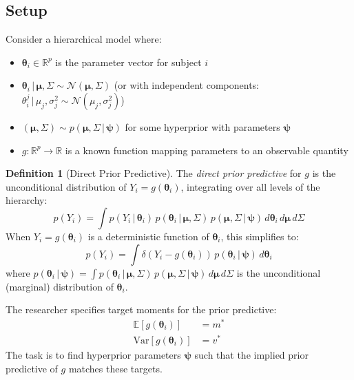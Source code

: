 \documentclass[11pt,a4paper]{article}
\theoremstyle{definition}
\newtheorem{definition}[theorem]{Definition}
\newcommand{\E}{\mathbb{E}}
\newcommand{\Var}{\mathrm{Var}}
\newcommand{\Normal}{\mathcal{N}}
\newcommand{\given}{\,|\,}
\newcommand{\bpsi}{\boldsymbol{\psi}}
\newcommand{\btheta}{\boldsymbol{\theta}}
\newcommand{\bmu}{\boldsymbol{\mu}}
\begin{document}
\subsection{Setup}

Consider a hierarchical model where:
\begin{itemize}
    \item $\btheta_i \in \mathbb{R}^p$ is the parameter vector for subject $i$
    \item $\btheta_i \given \bmu, \Sigma \sim \Normal(\bmu, \Sigma)$ (or with
        independent components: $\theta_i^j \given \mu_j, \sigma_j^2 \sim
        \Normal(\mu_j, \sigma_j^2)$)
    \item $(\bmu, \Sigma) \sim p(\bmu, \Sigma \given \bpsi)$ for some
        hyperprior with parameters $\bpsi$
    \item $g: \mathbb{R}^p \to \mathbb{R}$ is a known function mapping
        parameters to an observable quantity
\end{itemize}

\begin{definition}[Direct Prior Predictive]
The \emph{direct prior predictive} for $g$ is the unconditional distribution of
$Y_i = g(\btheta_i)$, integrating over all levels of the hierarchy:
\begin{equation}
    \label{eq:prior_predictive}
    p(Y_i) = \int p(Y_i \given \btheta_i) \, p(\btheta_i \given \bmu, \Sigma)
    \, p(\bmu, \Sigma \given \bpsi) \, d\btheta_i \, d\bmu \, d\Sigma
\end{equation}
When $Y_i = g(\btheta_i)$ is a deterministic function of $\btheta_i$, this
simplifies to:
\begin{equation}
    p(Y_i) = \int \delta(Y_i - g(\btheta_i)) \, p(\btheta_i \given \bpsi) \,
    d\btheta_i
\end{equation}
where $p(\btheta_i \given \bpsi) = \int p(\btheta_i \given \bmu, \Sigma) \,
p(\bmu, \Sigma \given \bpsi) \, d\bmu \, d\Sigma$ is the unconditional
(marginal) distribution of $\btheta_i$.
\end{definition}

The researcher specifies target moments for the prior predictive:
\begin{align}
    \E[g(\btheta_i)] &= m^* \\
    \Var[g(\btheta_i)] &= v^*
\end{align}
The task is to find hyperprior parameters $\bpsi$ such that the implied prior
predictive of $g$ matches these targets.
\end{document}
